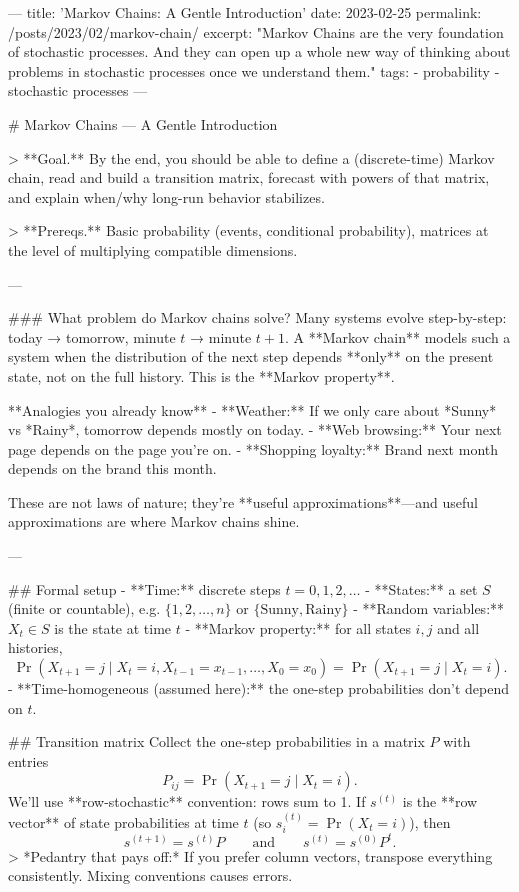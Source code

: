 ---
title: 'Markov Chains: A Gentle Introduction'
date: 2023-02-25
permalink: /posts/2023/02/markov-chain/
excerpt: "Markov Chains are the very foundation of stochastic processes. And they can open up a whole new way of thinking about problems in stochastic processes once we understand them."
tags:
  - probability
  - stochastic processes
---

# Markov Chains — A Gentle Introduction

> **Goal.** By the end, you should be able to define a (discrete-time) Markov chain, read and build a transition matrix, forecast with powers of that matrix, and explain when/why long-run behavior stabilizes.

> **Prereqs.** Basic probability (events, conditional probability), matrices at the level of multiplying compatible dimensions.

---

### What problem do Markov chains solve?
Many systems evolve step-by-step: today → tomorrow, minute $t$ → minute $t+1$. A **Markov chain** models such a system when the distribution of the next step depends **only** on the present state, not on the full history. This is the **Markov property**.

**Analogies you already know**
- **Weather:** If we only care about *Sunny* vs *Rainy*, tomorrow depends mostly on today.
- **Web browsing:** Your next page depends on the page you’re on.
- **Shopping loyalty:** Brand next month depends on the brand this month.

These are not laws of nature; they’re **useful approximations**—and useful approximations are where Markov chains shine.

---

## Formal setup
- **Time:** discrete steps $t=0,1,2,\dots$
- **States:** a set $S$ (finite or countable), e.g. $\{1,2,\dots,n\}$ or $\{\text{Sunny},\text{Rainy}\}$
- **Random variables:** $X_t\in S$ is the state at time $t$
- **Markov property:** for all states $i,j$ and all histories,
  $$
  \Pr(X_{t+1}=j\mid X_t=i, X_{t-1}=x_{t-1},\dots,X_0=x_0)=\Pr(X_{t+1}=j\mid X_t=i).
  $$
- **Time-homogeneous (assumed here):** the one-step probabilities don’t depend on $t$.

## Transition matrix
Collect the one-step probabilities in a matrix $P$ with entries
$$
P_{ij}=\Pr(X_{t+1}=j\mid X_t=i).
$$
We’ll use **row-stochastic** convention: rows sum to 1. If $s^{(t)}$ is the **row vector** of state probabilities at time $t$ (so $s^{(t)}_i=\Pr(X_t=i)$), then
$$
\boxed{s^{(t+1)} = s^{(t)}P}\qquad\text{and}\qquad s^{(t)}=s^{(0)}P^t.
$$
> *Pedantry that pays off:* If you prefer column vectors, transpose everything consistently. Mixing conventions causes errors.


